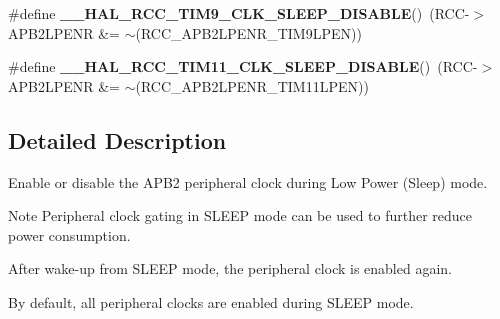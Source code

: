 \begin{DoxyCompactItemize}
\mbox{\label{group___r_c_c___a_p_b2___low_power___enable___disable_ga531cefe824de1fa7461b34030d30d75f}} 
\#define {\bfseries \+\_\+\+\_\+\+H\+A\+L\+\_\+\+R\+C\+C\+\_\+\+T\+I\+M9\+\_\+\+C\+L\+K\+\_\+\+S\+L\+E\+E\+P\+\_\+\+D\+I\+S\+A\+B\+LE}()~(R\+CC-\/$>$A\+P\+B2\+L\+P\+E\+NR \&= $\sim$(R\+C\+C\+\_\+\+A\+P\+B2\+L\+P\+E\+N\+R\+\_\+\+T\+I\+M9\+L\+P\+EN))
\item 
\mbox{\label{group___r_c_c___a_p_b2___low_power___enable___disable_gaf9c48fd8cd99db0e44d5427afe10c383}} 
\#define {\bfseries \+\_\+\+\_\+\+H\+A\+L\+\_\+\+R\+C\+C\+\_\+\+T\+I\+M11\+\_\+\+C\+L\+K\+\_\+\+S\+L\+E\+E\+P\+\_\+\+D\+I\+S\+A\+B\+LE}()~(R\+CC-\/$>$A\+P\+B2\+L\+P\+E\+NR \&= $\sim$(R\+C\+C\+\_\+\+A\+P\+B2\+L\+P\+E\+N\+R\+\_\+\+T\+I\+M11\+L\+P\+EN))
\end{DoxyCompactItemize}


\subsection{Detailed Description}
Enable or disable the A\+P\+B2 peripheral clock during Low Power (Sleep) mode. 

\begin{DoxyNote}{Note}
Peripheral clock gating in S\+L\+E\+EP mode can be used to further reduce power consumption. 

After wake-\/up from S\+L\+E\+EP mode, the peripheral clock is enabled again. 

By default, all peripheral clocks are enabled during S\+L\+E\+EP mode. 
\end{DoxyNote}
